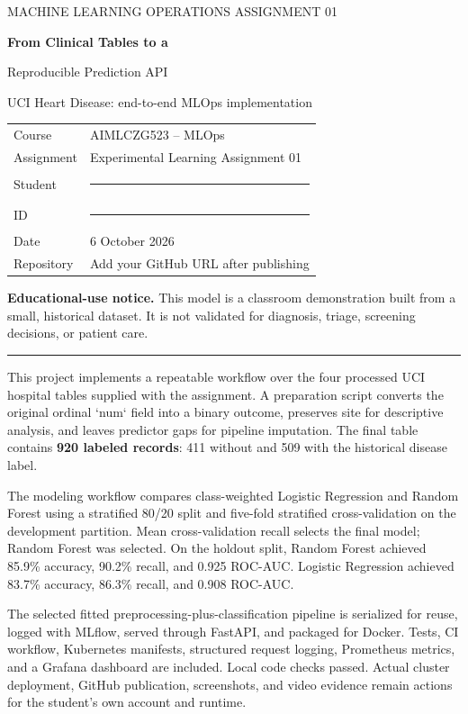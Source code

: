 \documentclass[10pt]{article}
\newcommand{\sectiontitle}[1]{\vspace*{0.15in}{\Large\bfseries\color{navy}#1}\par\vspace{0.08in}\hrule\vspace{0.16in}}
\newcommand{\callout}[1]{\noindent\colorbox{light}{\parbox{\dimexpr\linewidth-2\fboxsep}{#1}}}
\begin{document}
\thispagestyle{fancy}
\vspace*{0.55in}
{\color{teal}\large MACHINE LEARNING OPERATIONS \hfill ASSIGNMENT 01}\par
\vspace{0.35in}
{\Huge\bfseries\color{navy}From Clinical Tables to a\par Reproducible Prediction API}\par
\vspace{0.18in}
{\Large UCI Heart Disease: end-to-end MLOps implementation}\par
\vspace{0.45in}
\begin{tabular}{@{}ll@{}}
Course & AIMLCZG523 -- MLOps \\
Assignment & Experimental Learning Assignment 01 \\
Student & \rule{2.9in}{0.4pt} \\
ID & \rule{2.9in}{0.4pt} \\
Date & 6 October 2026 \\
Repository & Add your GitHub URL after publishing \\
\end{tabular}
\vspace{0.5in}

\callout{\textbf{Educational-use notice.} This model is a classroom demonstration built from a small, historical dataset. It is not validated for diagnosis, triage, screening decisions, or patient care.}

\vspace{0.38in}
\sectiontitle{Executive summary}
This project implements a repeatable workflow over the four processed UCI hospital tables supplied with the assignment. A preparation script converts the original ordinal `num` field into a binary outcome, preserves site for descriptive analysis, and leaves predictor gaps for pipeline imputation. The final table contains \textbf{920 labeled records}: 411 without and 509 with the historical disease label.

The modeling workflow compares class-weighted Logistic Regression and Random Forest using a stratified 80/20 split and five-fold stratified cross-validation on the development partition. Mean cross-validation recall selects the final model; Random Forest was selected. On the holdout split, Random Forest achieved 85.9\% accuracy, 90.2\% recall, and 0.925 ROC-AUC. Logistic Regression achieved 83.7\% accuracy, 86.3\% recall, and 0.908 ROC-AUC.

The selected fitted preprocessing-plus-classification pipeline is serialized for reuse, logged with MLflow, served through FastAPI, and packaged for Docker. Tests, CI workflow, Kubernetes manifests, structured request logging, Prometheus metrics, and a Grafana dashboard are included. Local code checks passed. Actual cluster deployment, GitHub publication, screenshots, and video evidence remain actions for the student's own account and runtime.
\end{document}
